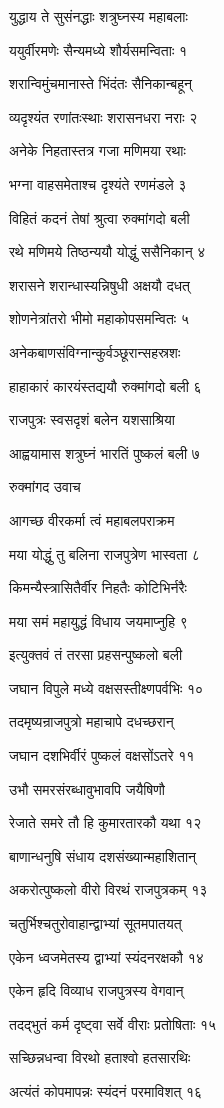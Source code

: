युद्धाय ते सुसंनद्धाः शत्रुघ्नस्य महाबलाः

ययुर्वीरमणेः सैन्यमध्ये शौर्यसमन्विताः १

शरान्विमुंचमानास्ते भिंदंतः सैनिकान्बहून्

व्यदृश्यंत रणांतःस्थाः शरासनधरा नराः २

अनेके निहतास्तत्र गजा मणिमया रथाः

भग्ना वाहसमेताश्च दृश्यंते रणमंडले ३

विहितं कदनं तेषां श्रुत्वा रुक्मांगदो बली

रथे मणिमये तिष्ठन्ययौ योद्धुं ससैनिकान् ४

शरासने शरान्धास्यन्निषुधी अक्षयौ दधत्

शोणनेत्रांतरो भीमो महाकोपसमन्वितः ५

अनेकबाणसंविग्नान्कुर्वञ्छूरान्सहस्रशः

हाहाकारं कारयंस्तद्ययौ रुक्मांगदो बली ६

राजपुत्रः स्वसदृशं बलेन यशसाश्रिया

आह्वयामास शत्रुघ्नं भारतिं पुष्कलं बली ७

रुक्मांगद उवाच

आगच्छ वीरकर्मा त्वं महाबलपराक्रम

मया योद्धुं तु बलिना राजपुत्रेण भास्वता ८

किमन्यैस्त्रासितैर्वीर निहतैः कोटिभिर्नरैः

मया समं महायुद्धं विधाय जयमाप्नुहि ९

इत्युक्तवं तं तरसा प्रहसन्पुष्कलो बली

जघान विपुले मध्ये वक्षसस्तीक्ष्णपर्वभिः १०

तदमृष्यन्राजपुत्रो महाचापे दधच्छरान्

जघान दशभिर्वीरं पुष्कलं वक्षसोंऽतरे ११

उभौ समरसंरब्धावुभावपि जयैषिणौ

रेजाते समरे तौ हि कुमारतारकौ यथा १२

बाणान्धनुषि संधाय दशसंख्यान्महाशितान्

अकरोत्पुष्कलो वीरो विरथं राजपुत्रकम् १३

चतुर्भिश्चतुरोवाहान्द्वाभ्यां सूतमपातयत्

एकेन ध्वजमेतस्य द्वाभ्यां स्यंदनरक्षकौ १४

एकेन हृदि विव्याध राजपुत्रस्य वेगवान्

तदद्भुतं कर्म दृष्ट्वा सर्वे वीराः प्रतोषिताः १५

सच्छिन्नधन्वा विरथो हताश्वो हतसारथिः

अत्यंतं कोपमापन्नः स्यंदनं परमाविशत् १६

